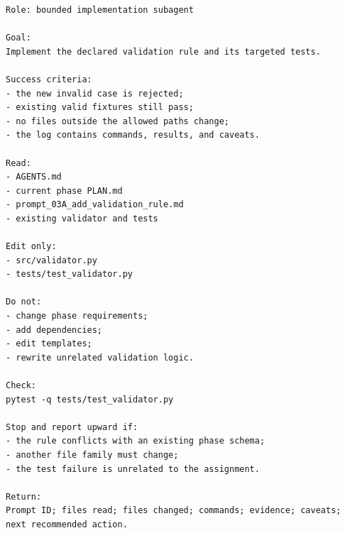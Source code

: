 \documentclass[11pt,a4paper]{article}
\begin{document}
\begin{lstlisting}[style=workflow]
Role: bounded implementation subagent

Goal:
Implement the declared validation rule and its targeted tests.

Success criteria:
- the new invalid case is rejected;
- existing valid fixtures still pass;
- no files outside the allowed paths change;
- the log contains commands, results, and caveats.

Read:
- AGENTS.md
- current phase PLAN.md
- prompt_03A_add_validation_rule.md
- existing validator and tests

Edit only:
- src/validator.py
- tests/test_validator.py

Do not:
- change phase requirements;
- add dependencies;
- edit templates;
- rewrite unrelated validation logic.

Check:
pytest -q tests/test_validator.py

Stop and report upward if:
- the rule conflicts with an existing phase schema;
- another file family must change;
- the test failure is unrelated to the assignment.

Return:
Prompt ID; files read; files changed; commands; evidence; caveats;
next recommended action.
\end{lstlisting}
\end{document}
